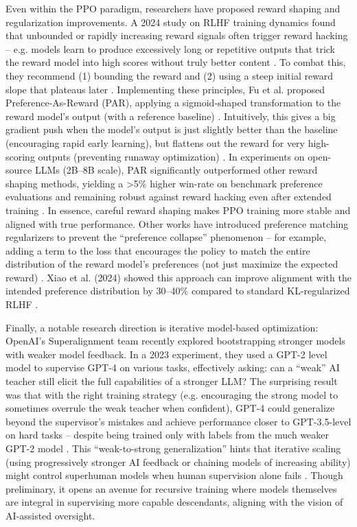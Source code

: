 \documentclass{article}
\begin{document}
Even within the PPO paradigm, researchers have proposed reward shaping and regularization improvements. A 2024 study on RLHF training dynamics found that unbounded or rapidly increasing reward signals often trigger reward hacking – e.g. models learn to produce excessively long or repetitive outputs that trick the reward model into high scores without truly better content  . To combat this, they recommend (1) bounding the reward and (2) using a steep initial reward slope that plateaus later  . Implementing these principles, Fu et al. proposed Preference-As-Reward (PAR), applying a sigmoid-shaped transformation to the reward model’s output (with a reference baseline)  . Intuitively, this gives a big gradient push when the model’s output is just slightly better than the baseline (encouraging rapid early learning), but flattens out the reward for very high-scoring outputs (preventing runaway optimization) . In experiments on open-source LLMs (2B–8B scale), PAR significantly outperformed other reward shaping methods, yielding a >5\% higher win-rate on benchmark preference evaluations and remaining robust against reward hacking even after extended training  . In essence, careful reward shaping makes PPO training more stable and aligned with true performance. Other works have introduced preference matching regularizers to prevent the “preference collapse” phenomenon – for example, adding a term to the loss that encourages the policy to match the entire distribution of the reward model’s preferences (not just maximize the expected reward)  . Xiao et al. (2024) showed this approach can improve alignment with the intended preference distribution by 30–40\% compared to standard KL-regularized RLHF  .

Finally, a notable research direction is iterative model-based optimization: OpenAI’s Superalignment team recently explored bootstrapping stronger models with weaker model feedback. In a 2023 experiment, they used a GPT-2 level model to supervise GPT-4 on various tasks, effectively asking: can a “weak” AI teacher still elicit the full capabilities of a stronger LLM?   The surprising result was that with the right training strategy (e.g. encouraging the strong model to sometimes overrule the weak teacher when confident), GPT-4 could generalize beyond the supervisor’s mistakes and achieve performance closer to GPT-3.5-level on hard tasks – despite being trained only with labels from the much weaker GPT-2 model  . This “weak-to-strong generalization” hints that iterative scaling (using progressively stronger AI feedback or chaining models of increasing ability) might control superhuman models when human supervision alone fails  . Though preliminary, it opens an avenue for recursive training where models themselves are integral in supervising more capable descendants, aligning with the vision of AI-assisted oversight.
\end{document}
